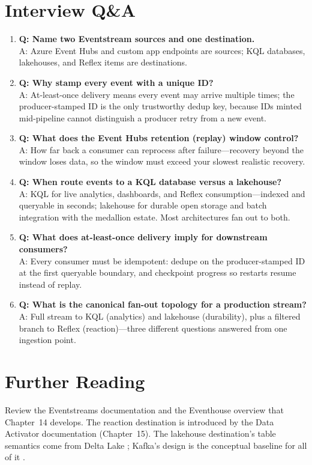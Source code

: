 \section{Interview Q\&A}
\begin{enumerate}
    \item \textbf{Q: Name two Eventstream sources and one destination.}\\
    A: Azure Event Hubs and custom app endpoints are sources; KQL databases, lakehouses, and Reflex items are destinations.
    \item \textbf{Q: Why stamp every event with a unique ID?}\\
    A: At-least-once delivery means every event may arrive multiple times; the producer-stamped ID is the only trustworthy dedup key, because IDs minted mid-pipeline cannot distinguish a producer retry from a new event.
    \item \textbf{Q: What does the Event Hubs retention (replay) window control?}\\
    A: How far back a consumer can reprocess after failure---recovery beyond the window loses data, so the window must exceed your slowest realistic recovery.
    \item \textbf{Q: When route events to a KQL database versus a lakehouse?}\\
    A: KQL for live analytics, dashboards, and Reflex consumption---indexed and queryable in seconds; lakehouse for durable open storage and batch integration with the medallion estate. Most architectures fan out to both.
    \item \textbf{Q: What does at-least-once delivery imply for downstream consumers?}\\
    A: Every consumer must be idempotent: dedupe on the producer-stamped ID at the first queryable boundary, and checkpoint progress so restarts resume instead of replay.
    \item \textbf{Q: What is the canonical fan-out topology for a production stream?}\\
    A: Full stream to KQL (analytics) and lakehouse (durability), plus a filtered branch to Reflex (reaction)---three different questions answered from one ingestion point.
\end{enumerate}

\section{Further Reading}
Review the Eventstreams documentation \cite{microsoftFabricEventstreams} and the Eventhouse overview \cite{microsoftFabricEventhouse} that Chapter~14 develops. The reaction destination is introduced by the Data Activator documentation \cite{microsoftDataActivator} (Chapter~15). The lakehouse destination's table semantics come from Delta Lake \cite{deltaLakeDocs}; Kafka's design is the conceptual baseline for all of it \cite{apacheKafka}.

